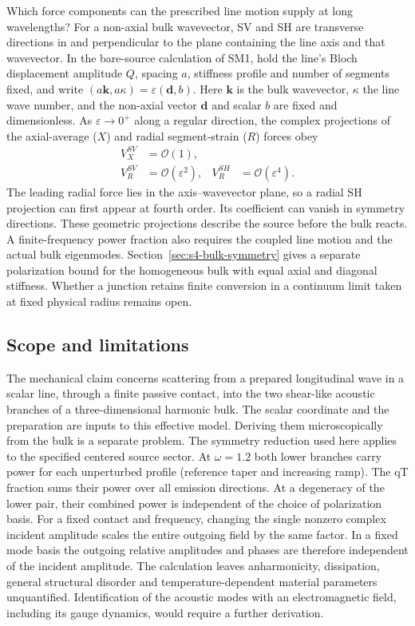 \documentclass[10pt,aps,onecolumn,floatfix,notitlepage,nofootinbib,showkeys]{revtex4-2}
\newcommand{\vk}{\bm{k}}
\newcommand{\order}{\mathcal O}
\begin{document}
Which force components can the prescribed line motion supply at long wavelengths? For a non-axial bulk wavevector, SV and SH are transverse directions in and perpendicular to the plane containing the line axis and that wavevector. In the bare-source calculation of SM1, hold the line's Bloch displacement amplitude $Q$, spacing $a$, stiffness profile and number of segments fixed, and write $(a\vk,a\kappa)=\varepsilon(\bm d,b)$. Here $\vk$ is the bulk wavevector, $\kappa$ the line wave number, and the non-axial vector $\bm d$ and scalar $b$ are fixed and dimensionless. As $\varepsilon\to0^+$ along a regular direction, the complex projections of the axial-average ($X$) and radial segment-strain ($R$) forces obey
\begin{align}
V_X^{SV}&=\order(1),\\
V_R^{SV}&=\order(\varepsilon^2),
&V_R^{SH}&=\order(\varepsilon^4).
\label{eq:s9-source-orders}
\end{align}
The leading radial force lies in the axis--wavevector plane, so a radial SH projection can first appear at fourth order. Its coefficient can vanish in symmetry directions. These geometric projections describe the source before the bulk reacts. A finite-frequency power fraction also requires the coupled line motion and the actual bulk eigenmodes. Section~\ref{sec:s4-bulk-symmetry} gives a separate polarization bound for the homogeneous bulk with equal axial and diagonal stiffness. Whether a junction retains finite conversion in a continuum limit taken at fixed physical radius remains open.

\subsection{Scope and limitations}
\label{sec:s9-limitations}

The mechanical claim concerns scattering from a prepared longitudinal wave in a scalar line, through a finite passive contact, into the two shear-like acoustic branches of a three-dimensional harmonic bulk. The scalar coordinate and the preparation are inputs to this effective model. Deriving them microscopically from the bulk is a separate problem. The symmetry reduction used here applies to the specified centered source sector. At $\omega=1.2$ both lower branches carry power for each unperturbed profile (reference taper and increasing ramp). The qT fraction sums their power over all emission directions. At a degeneracy of the lower pair, their combined power is independent of the choice of polarization basis. For a fixed contact and frequency, changing the single nonzero complex incident amplitude scales the entire outgoing field by the same factor. In a fixed mode basis the outgoing relative amplitudes and phases are therefore independent of the incident amplitude. The calculation leaves anharmonicity, dissipation, general structural disorder and temperature-dependent material parameters unquantified. Identification of the acoustic modes with an electromagnetic field, including its gauge dynamics, would require a further derivation.
\end{document}

